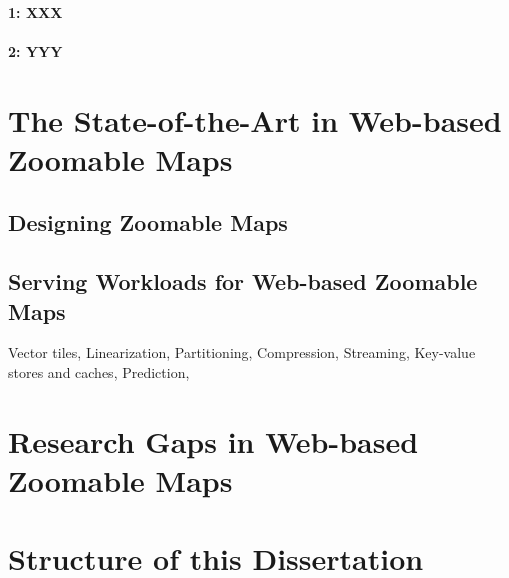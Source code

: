 \documentclass[11pt, oneside]{report}   	%
\begin{document}
\paragraph{1: XXX}

\paragraph{2: YYY}


\section{The State-of-the-Art in Web-based Zoomable Maps}

\subsection{Designing Zoomable Maps}

\subsection{Serving Workloads for Web-based Zoomable Maps}

Vector tiles, Linearization, Partitioning, Compression, Streaming, Key-value stores and caches, Prediction, 

\section{Research Gaps in Web-based Zoomable Maps}

\section{Structure of this Dissertation}


\end{document}
